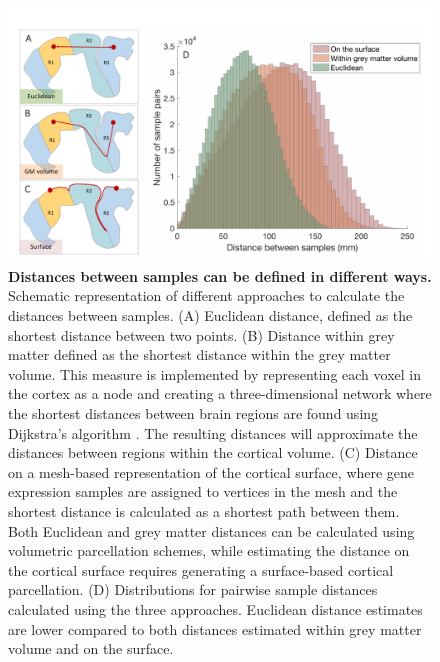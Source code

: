 \begin{figure}[h!]
  \centering
    \includegraphics[width=1\textwidth]{Chapter4/Ch4Fig7.pdf}
\caption{\textbf{Distances between samples can be defined in different ways.}
Schematic representation of different approaches to calculate the distances between samples.
(A) Euclidean distance, defined as the shortest distance between two points.
(B) Distance within grey matter defined as the shortest distance within the grey matter volume. This measure is implemented by representing each voxel in the cortex as a node and creating a three-dimensional network where the shortest distances between brain regions are found using Dijkstra's algorithm \citep{Dijkstra1959}. The resulting distances will approximate the distances between regions within the cortical volume.
(C) Distance on a mesh-based representation of the cortical surface, where gene expression samples are assigned to vertices in the mesh and the shortest distance is calculated as a shortest path between them. Both Euclidean and grey matter distances can be calculated using volumetric parcellation schemes, while estimating the distance on the cortical surface requires generating a surface-based cortical parcellation.
(D) Distributions for pairwise sample distances calculated using the three approaches. Euclidean distance estimates are lower compared to both distances estimated within grey matter volume and on the surface. }
\label{fig:Ch4Fig7}
\end{figure}

